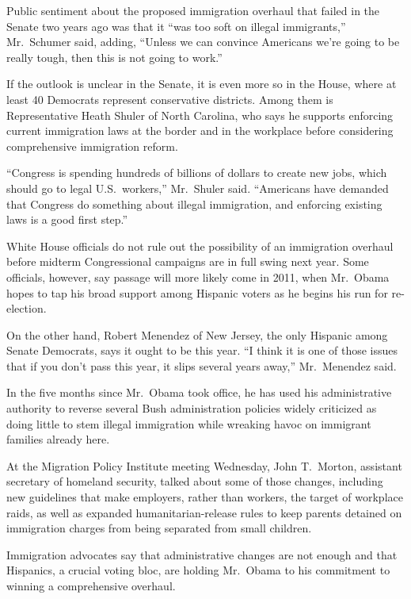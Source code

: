 ﻿\documentclass[12pt]{article}
\begin{document}
Public sentiment about the proposed immigration overhaul that failed in the Senate two years ago was
that it ``was too soft on illegal immigrants,'' Mr.~Schumer said, adding, ``Unless we can convince
Americans we're going to be really tough, then this is not going to work.''

If the outlook is unclear in the Senate, it is even more so in the House, where at least 40
Democrats represent conservative districts. Among them is Representative Heath Shuler of North
Carolina, who says he supports enforcing current immigration laws at the border and in the workplace
before considering comprehensive immigration reform.

``Congress is spending hundreds of billions of dollars to create new jobs, which should go to legal
U.S.~workers,'' Mr.~Shuler said. ``Americans have demanded that Congress do something about illegal
immigration, and enforcing existing laws is a good first step.''

White House officials do not rule out the possibility of an immigration overhaul before midterm
Congressional campaigns are in full swing next year. Some officials, however, say passage will more
likely come in 2011, when Mr.~Obama hopes to tap his broad support among Hispanic voters as he
begins his run for re-election.

On the other hand, Robert Menendez of New Jersey, the only Hispanic among Senate Democrats, says it
ought to be this year. ``I think it is one of those issues that if you don't pass this year, it
slips several years away,'' Mr.~Menendez said.

In the five months since Mr.~Obama took office, he has used his administrative authority to reverse
several Bush administration policies widely criticized as doing little to stem illegal immigration
while wreaking havoc on immigrant families already here.

At the Migration Policy Institute meeting Wednesday, John T.~Morton, assistant secretary of homeland
security, talked about some of those changes, including new guidelines that make employers, rather
than workers, the target of workplace raids, as well as expanded humanitarian-release rules to keep
parents detained on immigration charges from being separated from small children.

Immigration advocates say that administrative changes are not enough and that Hispanics, a crucial
voting bloc, are holding Mr.~Obama to his commitment to winning a comprehensive overhaul.
\end{document}
